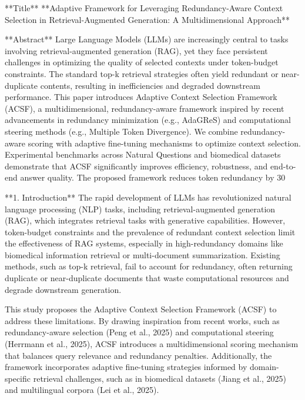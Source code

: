 **Title**  
**Adaptive Framework for Leveraging Redundancy-Aware Context Selection in Retrieval-Augmented Generation: A Multidimensional Approach**  

**Abstract**  
Large Language Models (LLMs) are increasingly central to tasks involving retrieval-augmented generation (RAG), yet they face persistent challenges in optimizing the quality of selected contexts under token-budget constraints. The standard top-k retrieval strategies often yield redundant or near-duplicate contents, resulting in inefficiencies and degraded downstream performance. This paper introduces Adaptive Context Selection Framework (ACSF), a multidimensional, redundancy-aware framework inspired by recent advancements in redundancy minimization (e.g., AdaGReS) and computational steering methods (e.g., Multiple Token Divergence). We combine redundancy-aware scoring with adaptive fine-tuning mechanisms to optimize context selection. Experimental benchmarks across Natural Questions and biomedical datasets demonstrate that ACSF significantly improves efficiency, robustness, and end-to-end answer quality. The proposed framework reduces token redundancy by 30%

**1. Introduction**  
The rapid development of LLMs has revolutionized natural language processing (NLP) tasks, including retrieval-augmented generation (RAG), which integrates retrieval tasks with generative capabilities. However, token-budget constraints and the prevalence of redundant context selection limit the effectiveness of RAG systems, especially in high-redundancy domains like biomedical information retrieval or multi-document summarization. Existing methods, such as top-k retrieval, fail to account for redundancy, often returning duplicate or near-duplicate documents that waste computational resources and degrade downstream generation.  

This study proposes the Adaptive Context Selection Framework (ACSF) to address these limitations. By drawing inspiration from recent works, such as redundancy-aware selection (Peng et al., 2025) and computational steering (Herrmann et al., 2025), ACSF introduces a multidimensional scoring mechanism that balances query relevance and redundancy penalties. Additionally, the framework incorporates adaptive fine-tuning strategies informed by domain-specific retrieval challenges, such as in biomedical datasets (Jiang et al., 2025) and multilingual corpora (Lei et al., 2025).  

